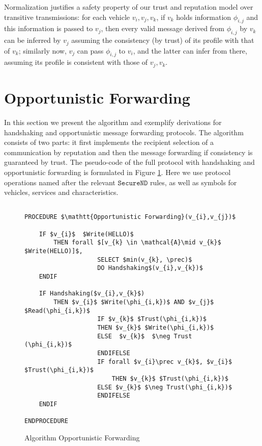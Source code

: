 \documentclass[compsoc, conference, letterpaper, 10pt, times]{IEEEtran}
\begin{document}
Normalization justifies a safety property of our trust and reputation model over transitive transmissions: for each vehicle $v_{i}, v_{j}, v_{k}$, if $v_{k}$ holds information $\phi_{i,j}$ and this information is passed to $v_{j}$, then every valid message derived from $\phi_{i,j}$ by $v_{k}$ can be inferred by $v_{j}$ assuming the consistency (by trust) of its profile with that of $v_{k}$; similarly now, $v_{j}$ can pass $\phi_{i,j}$ to $v_{i}$, and the latter can infer from there, assuming its profile is consistent with those of $v_{j}, v_{k}$.



\section{Opportunistic Forwarding}\label{sec:opportunistic}



In this section we present the algorithm and exemplify derivations for handshaking and opportunistic message forwarding protocols. The algorithm consists of two parts: it first implements the recipient selection of a communication by reputation and then the message forwarding if consistency is guaranteed by trust. The pseudo-code of the full protocol with handshaking and opportunistic forwarding is formulated in Figure \ref{fig:routine1}. Here we use protocol operations named after the relevant $\mathtt{SecureND}$ rules, as well as symbols for vehicles, services and characteristics.


\begin{figure}[t]
	\lstset{language=Java,
		basicstyle=\scriptsize,
		mathescape}
%	
	\begin{lstlisting}[frame=single]  % Start your code-block
	
PROCEDURE $\mathtt{Opportunistic Forwarding}(v_{i},v_{j})$
	
	IF $v_{i}$  $Write(HELLO)$ 
	    THEN forall $[v_{k} \in \mathcal{A}\mid v_{k}$ $Write(HELLO)]$, 
					SELECT $min(v_{k}, \prec)$
					DO Handshaking$(v_{i},v_{k})$
	ENDIF
			
	IF Handshaking($v_{i},v_{k}$)
		THEN $v_{i}$ $Write(\phi_{i,k})$ AND $v_{j}$ $Read(\phi_{i,k})$ 
					IF $v_{k}$ $Trust(\phi_{i,k})$
					THEN $v_{k}$ $Write(\phi_{i,k})$
					ELSE  $v_{k}$  $\neg Trust (\phi_{i,k})$
					ENDIFELSE
					IF forall $v_{i}\prec v_{k}$, $v_{i}$ $Trust(\phi_{i,k})$
						THEN $v_{k}$ $Trust(\phi_{i,k})$
					ELSE $v_{k}$ $\neg Trust(\phi_{i,k})$
					ENDIFELSE
	ENDIF
				
ENDPROCEDURE
	\end{lstlisting}
	\caption{Algorithm Opportunistic Forwarding}\label{fig:routine1}
\end{figure}
\end{document}

